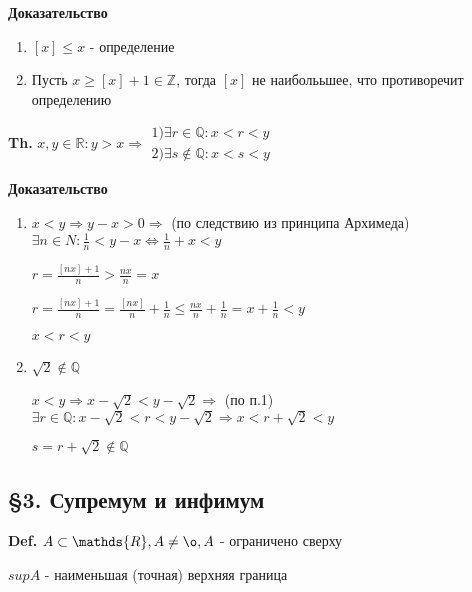 \documentclass[14pt, letter paper]{article}
\begin{document}
\begin{center}
    \textbf{Доказательство}
\end{center}

\begin{enumerate}
    \item $[x] \leq x$ - определение
    \item Пусть $x \geq [x] + 1 \in \mathds{Z}$, тогда $[x]$ не наиболььшее, что противоречит определению
\end{enumerate}

\textbf{Th.} $x, y \in \mathds{R}: y > x \Rightarrow \begin{gathered}
    1) \exists r \in \mathds{Q}: x < r < y \\
    2) \exists s \notin \mathds{Q}: x < s < y
\end{gathered}$

\begin{center}
    \textbf{Доказательство}
\end{center}

\begin{enumerate}
    \item $x < y \Rightarrow y - x > 0 \Rightarrow$ (по следствию из принципа Архимеда) $\exists n \in N: \frac{1}{n} < y - x \Leftrightarrow \frac{1}{n} + x < y$

    $r = \frac{[nx]+1}{n} > \frac{nx}{n} = x$

    $r = \frac{[nx]+1}{n} = \frac{[nx]}{n} + \frac{1}{n} \leq \frac{nx}{n} + \frac{1}{n} = x + \frac{1}{n} < y$

    $x < r < y$

    \item $\sqrt{2} \notin \mathds{Q}$

    $x < y \Rightarrow x - \sqrt{2} < y - \sqrt{2} \Rightarrow$ (по п.1) $\exists r \in \mathds{Q}: x - \sqrt{2} < r < y - \sqrt{2} \Rightarrow x < r + \sqrt{2} < y$

    $s = r + \sqrt{2} \notin \mathds{Q}$
\end{enumerate}

\begin{center}
    \subsection*{\S 3. Супремум и инфимум}
\end{center}

\textbf{Def.} $A \subset \mathds{R}, A \neq \o, A$ - ограничено сверху

$supA$ - наименьшая (точная) верхняя граница
\end{document}
